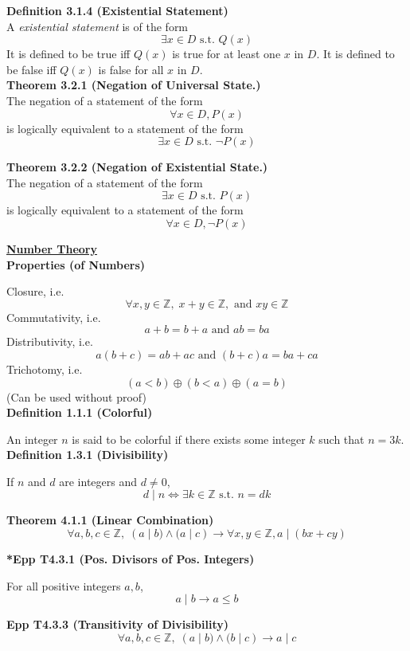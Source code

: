 \documentclass[a4paper]{article}
\newcommand{\heading}[1]{{\small\underline{\textbf{#1}}}}
\newcommand{\subheading}[1]{{\scriptsize\textbf{#1}}}
\newcommand\divides{\;|\;}
\begin{document}
\begin{multicols*}{4}
\subheading{Definition 3.1.4 (Existential Statement)}\\
A \textit{existential statement} is of the form $$\exists x \in D \text{ s.t. }
Q(x)$$ It is defined to be true iff $Q(x)$ is true for at least one $x$ in $D$.
It is defined to be false iff $Q(x)$ is false for all $x$ in $D$.\\

\subheading{Theorem 3.2.1 (Negation of Universal State.)}\\
The negation of a statement of the form $$\forall x \in D, P(x)$$ is logically
equivalent to a statement of the form $$\exists x \in D \text{ s.t. } \neg
P(x)$$

\subheading{Theorem 3.2.2 (Negation of Existential State.)}\\
The negation of a statement of the form $$\exists x \in D \text{ s.t. } P(x)$$
is logically equivalent to a statement of the form $$\forall x \in D, \neg
P(x)$$

\heading{Number Theory} \\

\subheading{Properties (of Numbers)}

Closure, i.e.
$$\forall x, y \in \mathbb{Z},\;
         x + y \in \mathbb{Z},\text{ and }
            xy \in \mathbb{Z}$$
Commutativity, i.e.
  $$a+b=b+a\text{ and }ab=ba$$
Distributivity, i.e.
  $$a(b+c) = ab + ac \text{ and } (b+c)a = ba + ca$$
Trichotomy, i.e.
  $$(a < b) \oplus (b < a) \oplus (a = b)$$
(Can be used without proof)\\

\subheading{Definition 1.1.1 (Colorful)}

An integer $n$ is said to be colorful if there exists some integer $k$ such
that $n = 3k$.\\

\subheading{Definition 1.3.1 (Divisibility)}

If $n$ and $d$ are integers and $d \neq 0$,
  $$ d \divides n \iff \exists k \in \mathbb{Z} \text{ s.t. } n=dk $$

\subheading{Theorem 4.1.1 (Linear Combination)}
$$\forall a,b,c \in \mathbb{Z},\;
(a \divides b) \land (a \divides c)
    \rightarrow \forall x,y \in \mathbb{Z}, a \divides (bx + cy)$$

\subheading{*Epp T4.3.1 (Pos. Divisors of Pos. Integers)}

For all positive integers $a, b$, $$a \divides b \rightarrow a \leq b$$

\subheading{Epp T4.3.3 (Transitivity of Divisibility)}
$$\forall a, b, c \in \mathbb{Z},\;
(a \divides b) \land (b \divides c) \rightarrow a \divides c$$


\end{multicols*}
\end{document}

